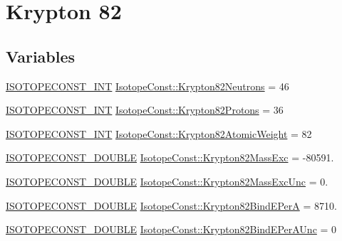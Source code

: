\hypertarget{group___isotope_const-_krypton-_kr82}{}\section{Krypton 82}
\label{group___isotope_const-_krypton-_kr82}
\subsection*{Variables}
\begin{DoxyCompactItemize}
\item 
\mbox{\hyperlink{group___isotope_const-_macros_ga5f18360b3e99483a35c32d789e62621c}{I\+S\+O\+T\+O\+P\+E\+C\+O\+N\+S\+T\+\_\+\+I\+NT}} \mbox{\hyperlink{group___isotope_const-_krypton-_kr82_gab70c9fc5b820d7cef83fd26ffd668d8c}{Isotope\+Const\+::\+Krypton82\+Neutrons}} = 46
\item 
\mbox{\hyperlink{group___isotope_const-_macros_ga5f18360b3e99483a35c32d789e62621c}{I\+S\+O\+T\+O\+P\+E\+C\+O\+N\+S\+T\+\_\+\+I\+NT}} \mbox{\hyperlink{group___isotope_const-_krypton-_kr82_ga3bb6705df38f5f76434e2faa9019d533}{Isotope\+Const\+::\+Krypton82\+Protons}} = 36
\item 
\mbox{\hyperlink{group___isotope_const-_macros_ga5f18360b3e99483a35c32d789e62621c}{I\+S\+O\+T\+O\+P\+E\+C\+O\+N\+S\+T\+\_\+\+I\+NT}} \mbox{\hyperlink{group___isotope_const-_krypton-_kr82_ga2955570bd3bc2b97920b991f72de5fa6}{Isotope\+Const\+::\+Krypton82\+Atomic\+Weight}} = 82
\item 
\mbox{\hyperlink{group___isotope_const-_macros_ga8f45a7272ce02c0b4c65c44636ed719a}{I\+S\+O\+T\+O\+P\+E\+C\+O\+N\+S\+T\+\_\+\+D\+O\+U\+B\+LE}} \mbox{\hyperlink{group___isotope_const-_krypton-_kr82_ga83d74d15d65a40f1a9b4c2a2b7cd0766}{Isotope\+Const\+::\+Krypton82\+Mass\+Exc}} = -\/80591.
\item 
\mbox{\hyperlink{group___isotope_const-_macros_ga8f45a7272ce02c0b4c65c44636ed719a}{I\+S\+O\+T\+O\+P\+E\+C\+O\+N\+S\+T\+\_\+\+D\+O\+U\+B\+LE}} \mbox{\hyperlink{group___isotope_const-_krypton-_kr82_ga0e4394f9c05953bf2085ed5707b43726}{Isotope\+Const\+::\+Krypton82\+Mass\+Exc\+Unc}} = 0.
\item 
\mbox{\hyperlink{group___isotope_const-_macros_ga8f45a7272ce02c0b4c65c44636ed719a}{I\+S\+O\+T\+O\+P\+E\+C\+O\+N\+S\+T\+\_\+\+D\+O\+U\+B\+LE}} \mbox{\hyperlink{group___isotope_const-_krypton-_kr82_gac372ac3bb39895fdea0c0dad39913d8b}{Isotope\+Const\+::\+Krypton82\+Bind\+E\+PerA}} = 8710.
\item 
\mbox{\hyperlink{group___isotope_const-_macros_ga8f45a7272ce02c0b4c65c44636ed719a}{I\+S\+O\+T\+O\+P\+E\+C\+O\+N\+S\+T\+\_\+\+D\+O\+U\+B\+LE}} \mbox{\hyperlink{group___isotope_const-_krypton-_kr82_gaebef25ae822a43a20641e7880edc0e12}{Isotope\+Const\+::\+Krypton82\+Bind\+E\+Per\+A\+Unc}} = 0

\end{DoxyCompactItemize}
